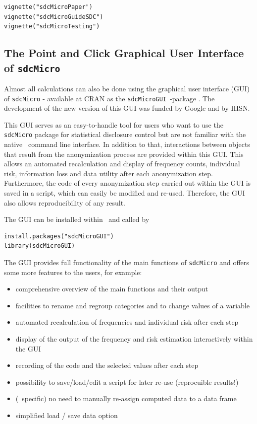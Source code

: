 \documentclass[12pt]{article}
\newcommand{\sdcMicro}{\texttt{sdcMicro}}
\newcommand{\sdcMicroGUI}{\texttt{sdcMicroGUI}}
\begin{document}
\begin{lstlisting}[frame=single, label=listing:vignette, caption={Accessing the package vignettes of \sdcMicro.}] 
vignette("sdcMicroPaper")
vignette("sdcMicroGuideSDC")
vignette("sdcMicroTesting")
\end{lstlisting}


\subsection{The Point and Click Graphical User Interface of \texttt{sdcMicro}}

Almost all calculations can also be done using the graphical user interface (GUI) 
of \texttt{sdcMicro} - available at CRAN as the \sdcMicroGUI \ \R -package 
\citep{Templ09tdp,sdcMicroGUI}. 
The development of the new version of this GUI was funded by Google and by IHSN. 

This GUI 
serves as an easy-to-handle tool for users who want to use the \texttt{sdcMicro}
package for statistical disclosure control but are not
familiar with the native  \R \ command line interface.  
In addition to that,
interactions between objects that result from the anonymization process
are provided within this GUI. This allows an automated recalculation and
display of frequency counts, individual risk, information loss
and data utility after each anonymization step. Furthermore, the code of every
anonymization step carried out within the GUI is saved in a script, which can
easily be modified and re-used. Therefore, the GUI also allows reproducibility 
of any result.

The GUI can be installed within \R \ and called by
\begin{lstlisting}[numbers=none,captionpos=b, caption={The graphical user interface of sdcMicro.}, label=listing:gui]
install.packages("sdcMicroGUI")
library(sdcMicroGUI)
\end{lstlisting}


The GUI provides full
functionality of the main functions of \texttt{sdcMicro} and offers some more
features to the users, for example:
\begin{itemize}
  	\item comprehensive overview of the main functions and their output
	\item facilities to rename and regroup categories and to change values of a
	variable
	\item automated recalculation of frequencies and individual risk after each
	step 
	\item display of the output of the frequency and risk
	estimation interactively within the GUI 
	\item recording of the code and the selected values after each step
	\item possibility to save/load/edit a script for later re-use (reprocuible results!)
	\item (\R \ specific) no need to manually re-assign computed data to a data frame
	\item simplified load / save data option
\end{itemize}
\end{document}
